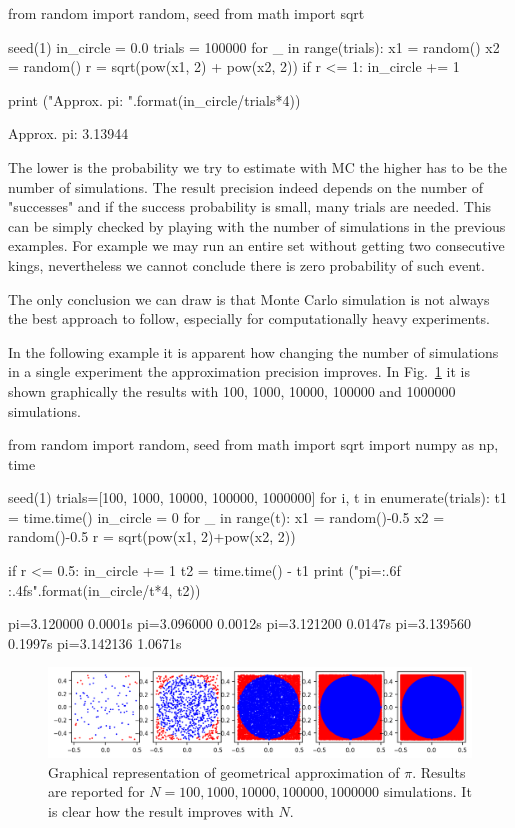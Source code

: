 \begin{ipython}
from random import random, seed
from math import sqrt

seed(1)
in_circle = 0.0
trials = 100000
for _ in range(trials):
    x1 = random()
    x2 = random()
    r = sqrt(pow(x1, 2) + pow(x2, 2))
    if r <= 1:
        in_circle += 1

print ("Approx. pi: {}".format(in_circle/trials*4))
\end{ipython}
\begin{ioutput}
Approx. pi: 3.13944
\end{ioutput}

The lower is the probability we try to estimate with MC the higher has to be the number of simulations. 
The result precision indeed depends on the number of "successes" and if the success probability is small, many trials are needed. This can be simply checked by playing with the number of simulations in the previous examples. For example we may run an entire set without getting two consecutive kings, nevertheless we cannot conclude there is zero probability of such event.

The only conclusion we can draw is that Monte Carlo simulation is not always the best approach to follow, especially for computationally heavy experiments.

In the following example it is apparent how changing the number of simulations in a single experiment the approximation precision improves. In Fig.~\ref{fig:circle_approx} it is shown graphically the results with 100, 1000, 10000, 100000 and 1000000 simulations.

\begin{ipython}
from random import random, seed
from math import sqrt
import numpy as np, time

seed(1)
trials=[100, 1000, 10000, 100000, 1000000]
for i, t in enumerate(trials):
    t1 = time.time()
    in_circle = 0
    for _ in range(t):
        x1 = random()-0.5
        x2 = random()-0.5
        r = sqrt(pow(x1, 2)+pow(x2, 2))

        if r <= 0.5:
            in_circle += 1
    t2 = time.time() - t1
    print ("pi={:.6f} {:.4f}s".format(in_circle/t*4, t2))
\end{ipython}
\begin{ioutput}
pi=3.120000 0.0001s
pi=3.096000 0.0012s
pi=3.121200 0.0147s
pi=3.139560 0.1997s
pi=3.142136 1.0671s
\end{ioutput}

\begin{figure}[htb]
\centering
\includegraphics[width=1\textwidth]{figures/mc_vs_n_experiments}
\caption{Graphical representation of geometrical approximation of $\pi$. Results are reported for $N = 100, 1000, 10000, 100000, 1000000$ simulations. It is clear how the result improves with $N$.}
\label{fig:circle_approx}
\end{figure}

